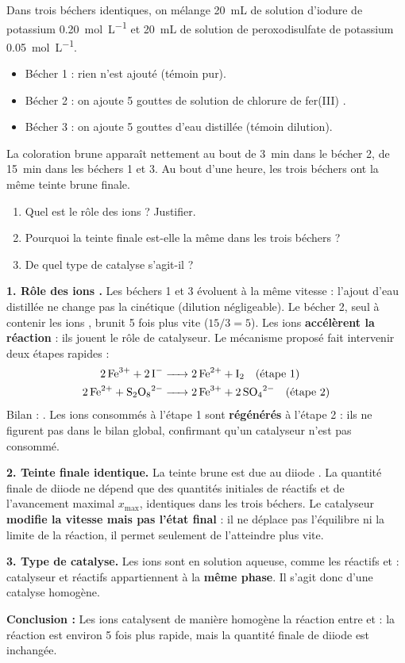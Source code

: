 \documentclass[11pt]{article}
\newcommand{\cle}[1]{{\popxbold\color{popdark}#1}}
\begin{document}
\begin{exoresolu}
Dans trois béchers identiques, on mélange \SI{20}{mL} de solution d'iodure de potassium \SI{0,20}{mol.L^{-1}} et \SI{20}{mL} de solution de peroxodisulfate de potassium \SI{0,05}{mol.L^{-1}}.
\begin{itemize}
\item Bécher 1 : rien n'est ajouté (témoin pur).
\item Bécher 2 : on ajoute 5 gouttes de solution de chlorure de fer(III) .
\item Bécher 3 : on ajoute 5 gouttes d'eau distillée (témoin dilution).
\end{itemize}
La coloration brune apparaît nettement au bout de \SI{3}{min} dans le bécher 2, de \SI{15}{min} dans les béchers 1 et 3. Au bout d'une heure, les trois béchers ont la même teinte brune finale.
\begin{enumerate}
\item Quel est le rôle des ions  ? Justifier.
\item Pourquoi la teinte finale est-elle la même dans les trois béchers ?
\item De quel type de catalyse s'agit-il ?
\end{enumerate}
\tcblower
\textbf{1. Rôle des ions .}
Les béchers 1 et 3 évoluent à la même vitesse : l'ajout d'eau distillée ne change pas la cinétique (dilution négligeable). Le bécher 2, seul à contenir les ions , brunit 5 fois plus vite ($15/3 = 5$). Les ions  \textbf{accélèrent la réaction} : ils jouent le rôle de \cle{catalyseur}.
Le mécanisme proposé fait intervenir deux étapes rapides :
\begin{align*}
\ce{2 Fe^3+ + 2 I- &-> 2 Fe^2+ + I2} \quad \text{(étape 1)} \\
\ce{2 Fe^2+ + S2O8^2- &-> 2 Fe^3+ + 2 SO4^2-} \quad \text{(étape 2)}
\end{align*}
Bilan : . Les ions  consommés à l'étape 1 sont \textbf{régénérés} à l'étape 2 : ils ne figurent pas dans le bilan global, confirmant qu'un catalyseur n'est pas consommé.

\textbf{2. Teinte finale identique.}
La teinte brune est due au diiode . La quantité finale de diiode ne dépend que des quantités initiales de réactifs et de l'avancement maximal $x_{\max}$, identiques dans les trois béchers. Le catalyseur \textbf{modifie la vitesse mais pas l'état final} : il ne déplace pas l'équilibre ni la limite de la réaction, il permet seulement de l'atteindre plus vite.

\textbf{3. Type de catalyse.}
Les ions  sont en solution aqueuse, comme les réactifs  et  : catalyseur et réactifs appartiennent à la \textbf{même phase}. Il s'agit donc d'une \cle{catalyse homogène}.

\textbf{Conclusion :} Les ions  catalysent de manière homogène la réaction entre  et  : la réaction est environ 5 fois plus rapide, mais la quantité finale de diiode est inchangée.
\end{exoresolu}
\end{document}
